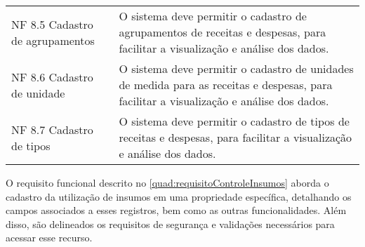 \begin{tabframed}[htb]
\begin{tabular}{|l|l|}
    NF 8.5 Cadastro de agrupamentos &
    \multicolumn{1}{|p{8cm}|}{\raggedright
    O sistema deve permitir o cadastro de agrupamentos de receitas e despesas, para facilitar a visualização e análise dos dados.}
    \\ \cline{1-2}

    NF 8.6 Cadastro de unidade      &
    \multicolumn{1}{|p{8cm}|}{\raggedright
    O sistema deve permitir o cadastro de unidades de medida para as receitas e despesas, para facilitar a visualização e análise dos dados.}
    \\ \cline{1-2}

    NF 8.7 Cadastro de tipos        &
    \multicolumn{1}{|p{8cm}|}{\raggedright
    O sistema deve permitir o cadastro de tipos de receitas e despesas, para facilitar a visualização e análise dos dados.}
    \\ \cline{1-2}
  \end{tabular}
  \fonte{} %
\end{tabframed}

\clearpage

O requisito funcional descrito no \autoref{quad:requisitoControleInsumos}  aborda o cadastro da utilização de insumos em uma propriedade específica, detalhando os campos associados a esses registros, bem como as outras funcionalidades. Além disso, são delineados os requisitos de segurança e validações necessários para acessar esse recurso.

